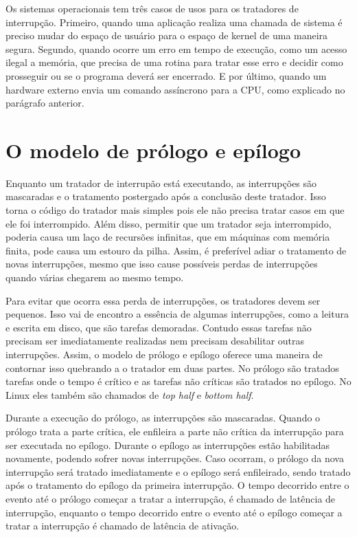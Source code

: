 Os sistemas operacionais tem três casos de usos para os tratadores de interrupção. Primeiro, quando uma aplicação realiza uma chamada de sistema é preciso mudar do espaço de usuário para o espaço de kernel de uma maneira segura. Segundo, quando ocorre um erro em tempo de execução, como um acesso ilegal a memória, que precisa de uma rotina para tratar esse erro e decidir como prosseguir ou se o programa deverá ser encerrado. E por último, quando um hardware externo envia um comando assíncrono para a CPU, como explicado no parágrafo anterior.

\section{O modelo de prólogo e epílogo}

Enquanto um tratador de interrupão está executando, as interrupções são mascaradas e o tratamento postergado após a conclusão deste tratador. Isso torna o código do tratador mais simples pois ele não precisa tratar casos em que ele foi interrompido. Além disso, permitir que um tratador seja interrompido, poderia causa um laço de recursões infinitas, que em máquinas com memória finita, pode causa um estouro da pilha. Assim, é preferível adiar o tratamento de novas interrupções, mesmo que isso cause possíveis perdas de interrupções quando várias chegarem ao mesmo tempo.

Para evitar que ocorra essa perda de interrupções, os tratadores devem ser pequenos. Isso vai de encontro a essência de algumas interrupções, como a leitura e escrita em disco, que são tarefas demoradas. Contudo essas tarefas não precisam ser imediatamente realizadas nem precisam desabilitar outras interrupções. Assim, o modelo de prólogo e epílogo oferece uma maneira de contornar isso quebrando a o tratador em duas partes. No prólogo são tratados tarefas onde o tempo é crítico e as tarefas não críticas são tratados no epílogo. No Linux eles também são chamados de \textit{top half} e \textit{bottom half}.

Durante a execução do prólogo, as interrupções são mascaradas. Quando o prólogo trata a parte crítica, ele enfileira a parte não crítica da interrupção para ser executada no epílogo. Durante o epílogo as interrupções estão habilitadas novamente, podendo sofrer novas interrupções. Caso ocorram, o prólogo da nova interrupção será tratado imediatamente e o epílogo será enfileirado, sendo tratado após o tratamento do epílogo da primeira interrupção. O tempo decorrido entre o evento até o prólogo começar a tratar a interrupção, é chamado de latência de interrupção, enquanto o tempo decorrido entre o evento até o epílogo começar a tratar a interrupção é chamado de latência de ativação.

